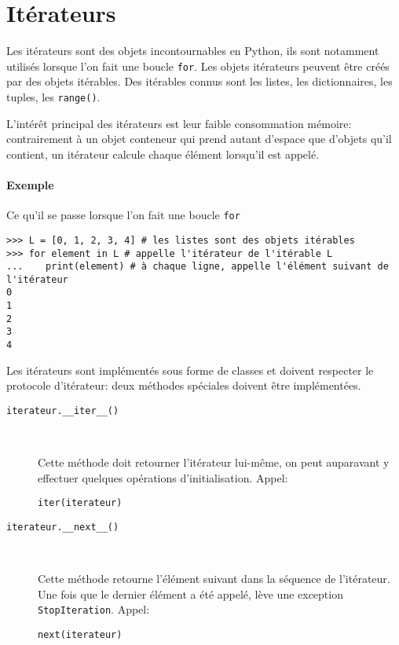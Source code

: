 \section{Itérateurs}\label{iterateur}

Les itérateurs sont des objets incontournables en Python, ils sont notamment utilisés lorsque l'on fait une boucle \texttt{for}. Les objets itérateurs peuvent être créés par des objets itérables. Des itérables connus sont les listes, les dictionnaires, les tuples, les \texttt{range()}.\medskip

L'intérêt principal des itérateurs est leur faible consommation mémoire: contrairement à un objet conteneur qui prend autant d'espace que d'objets qu'il contient, un itérateur calcule chaque élément lorsqu'il est appelé.

\paragraph{Exemple} Ce qu'il se passe lorsque l'on fait une boucle \texttt{for}
\begin{verbatim}
>>> L = [0, 1, 2, 3, 4] # les listes sont des objets itérables
>>> for element in L # appelle l'itérateur de l'itérable L
...    print(element) # à chaque ligne, appelle l'élément suivant de l'itérateur
0
1
2
3
4
\end{verbatim}

Les itérateurs sont implémentés sous forme de classes et doivent respecter le protocole d'itérateur: deux méthodes spéciales doivent être implémentées.
\begin{description}
    \item[\texttt{iterateur.__iter__()}]~

    Cette méthode doit retourner l'itérateur lui-même, on peut auparavant y effectuer quelques opérations d’initialisation. Appel:
    \begin{verbatim}
iter(iterateur)
    \end{verbatim}

    \item[\texttt{iterateur.__next__()}]~

    Cette méthode retourne l'élément suivant dans la séquence de l'itérateur. Une fois que le dernier élément a été appelé, lève une exception \texttt{StopIteration}. Appel:
    \begin{verbatim}
next(iterateur)
    \end{verbatim}
\end{description}

